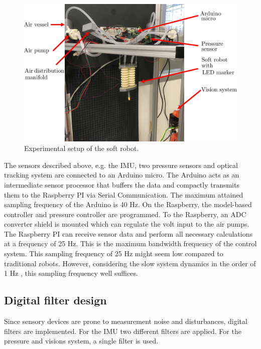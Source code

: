 \begin{figure}[H]
    \centering
    \includegraphics[width = \textwidth]{Figures/Chapter5/expsetup.png}
    \caption{Experimental setup of the soft robot.}
    \label{fig5:setup}
\end{figure}


The sensors described above, e.g. the IMU, two pressure sensors and optical tracking system are connected to an Arduino micro. The Arduino acts as an intermediate sensor processor that buffers the data and compactly transmits them to the Raspberry PI via Serial Communication. The maximum attained sampling frequency of the Arduino is 40 Hz. On the Raspberry, the model-based controller and pressure controller are programmed. To the Raspberry, an ADC converter shield is mounted which can regulate the volt input to the air pumps. The Raspberry PI can receive sensor data and perform all necessary calculations at a frequency of 25 Hz. This is the maximum bandwidth frequency of the control system. This sampling frequency of 25 Hz might seem low compared to traditional robots. However, considering the slow system dynamics in the order of 1 Hz \cite{tawk2018bioinspired},\cite{HighBandwidthControl} this sampling frequency well suffices.


\subsection*{Digital filter design}

Since sensory devices are prone to measurement noise and disturbances, digital filters are implemented. For the IMU two different filters are applied. For the pressure and visions system, a single filter is used. 

